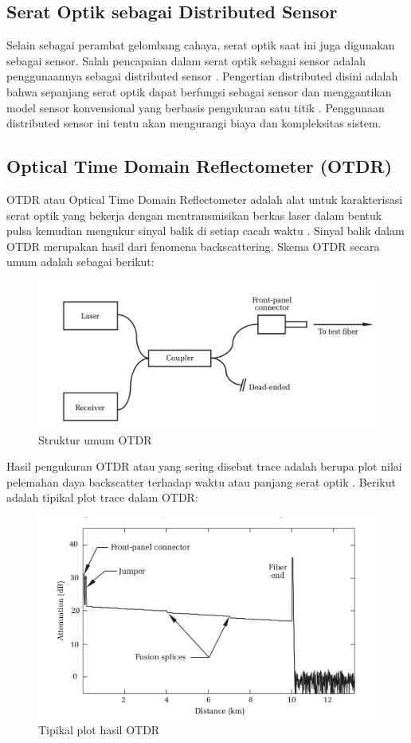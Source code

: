 \documentclass[12pt]{article}
\begin{document}
	\subsection{Serat Optik sebagai Distributed Sensor}
	
	Selain sebagai perambat gelombang cahaya, serat optik saat ini juga digunakan sebagai sensor.
	Salah pencapaian dalam serat optik sebagai sensor adalah penggunaannya sebagai distributed sensor \cite{Dakin1992}.
	Pengertian distributed  disini adalah bahwa sepanjang serat optik dapat berfungsi sebagai sensor dan menggantikan model sensor konvensional yang berbasis pengukuran satu titik \cite{Wu2015}.
	Penggunaan distributed sensor ini tentu akan mengurangi biaya dan kompleksitas sistem.
	
	\subsection{Optical Time Domain Reflectometer (OTDR)}
	
	OTDR atau Optical Time Domain Reflectometer adalah alat untuk karakterisasi serat optik yang bekerja dengan mentransmisikan berkas laser dalam bentuk pulsa kemudian mengukur sinyal balik di setiap cacah waktu \cite{test2017}.
	Sinyal balik dalam OTDR merupakan hasil dari fenomena backscattering.
	Skema OTDR secara umum adalah sebagai berikut:
	
	\begin{figure}[!ht]
		\centering
		\captionsetup{justification=centering}
		\includegraphics[width=0.65\linewidth]{images/Bab_2/Bab_2_5}
		\caption[Struktur umum OTDR]{\small{Struktur umum OTDR}}
	\end{figure}

	Hasil pengukuran OTDR atau yang sering disebut trace adalah berupa plot nilai pelemahan daya backscatter terhadap waktu atau panjang serat optik \cite{Anderson2004}.
	Berikut adalah tipikal plot trace dalam OTDR:
	
	\begin{figure}[!ht]
		\centering
		\captionsetup{justification=centering}
		\includegraphics[width=0.7\linewidth]{images/Bab_2/Bab_2_6}
		\caption[Tipikal plot hasil OTDR]{\small{Tipikal plot hasil OTDR}}
	\end{figure}
\end{document}
